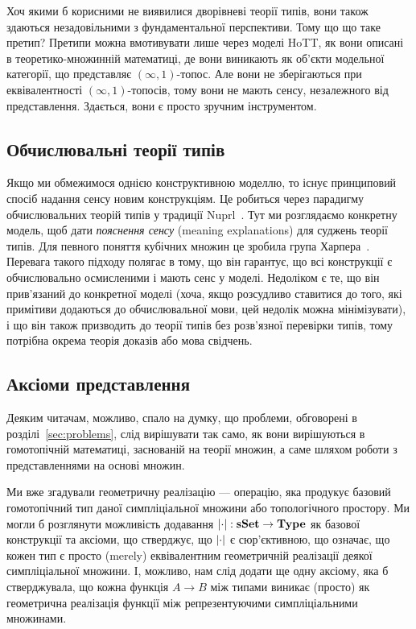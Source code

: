 \documentclass[12pt]{article}
\newcommand*{\inftyone}{\ensuremath{(\infty,1)}}
\newcommand*{\Type}{\ensuremath{\mathbf{Type}}}
\newcommand*{\sSet}{\ensuremath{\mathbf{sSet}}}
\DeclarePairedDelimiter\abs{\lvert}{\rvert} %
\begin{document}
Хоч якими б корисними не виявилися дворівневі теорії типів, вони також здаються незадовільними з фундаментальної перспективи. Тому що що таке претип? Претипи можна вмотивувати лише через моделі HoTT, як вони описані в теоретико-множинній математиці, де вони виникають як об'єкти модельної категорії, що представляє \inftyone-топос. Але вони не зберігаються при еквівалентності \inftyone-топосів, тому вони не мають сенсу, незалежного від представлення. Здається, вони є просто зручним інструментом.

\subsection{Обчислювальні теорії типів}

Якщо ми обмежимося однією конструктивною моделлю, то існує принциповий спосіб надання сенсу новим конструкціям. Це робиться через парадигму обчислювальних теорій типів у традиції Nuprl~\cite{Nuprl-book}. Тут ми розглядаємо конкретну модель, щоб дати \emph{пояснення сенсу} (meaning explanations) для суджень теорії типів. Для певного поняття кубічних множин це зробила група Харпера~\cite{Angiuli-Harper-Wilson2017,AngiuliHarper2018}. Перевага такого підходу полягає в тому, що він гарантує, що всі конструкції є обчислювально осмисленими і мають сенс у моделі. Недоліком є те, що він прив'язаний до конкретної моделі (хоча, якщо розсудливо ставитися до того, які примітиви додаються до обчислювальної мови, цей недолік можна мінімізувати), і що він також призводить до теорії типів без розв'язної перевірки типів, тому потрібна окрема теорія доказів або мова свідчень.

\subsection{Аксіоми представлення}

Деяким читачам, можливо, спало на думку, що проблеми, обговорені в розділі~\ref{sec:problems}, слід вирішувати так само, як вони вирішуються в гомотопічній математиці, заснованій на теорії множин, а саме шляхом роботи з представленнями на основі множин.

Ми вже згадували геометричну реалізацію — операцію, яка продукує базовий гомотопічний тип даної симпліціальної множини або топологічного простору. Ми могли б розглянути можливість додавання $\abs\cdot : \sSet \to \Type$ як базової конструкції та аксіоми, що стверджує, що $\abs\cdot$ є сюр'єктивною, що означає, що кожен тип є просто (merely) еквівалентним геометричній реалізації деякої симпліціальної множини. І, можливо, нам слід додати ще одну аксіому, яка б стверджувала, що кожна функція $A \to B$ між типами виникає (просто) як геометрична реалізація функції між репрезентуючими симпліціальними множинами.
\end{document}
